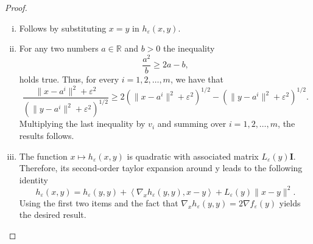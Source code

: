 \documentclass[11pt]{article}
\numberwithin{equation}{section}
\begin{document}
\begin{proof}
\begin{enumerate}[(i)]
	\item Follows by substituting $x=y$ in $h_{\varepsilon}(x,y)$.
	\item For any two numbers $a \in \mathbb{R}$ and $b>0$ the inequality 
	\begin{equation*}
		\frac{a^2}{b} \geq 2a - b ,
	\end{equation*}
	holds true. Thus, for every $i=1,2, \ldots ,m$, we have that
	\begin{equation*}
		\frac{\|x-a^i\|^2 + {\varepsilon}^2}{\left( \|y-a^i\|^2 + {\varepsilon}^2 \right)^{1/2}} \geq 2\left( \|x-a^i\|^2 + {\varepsilon}^2 \right)^{1/2} - \left( \|y-a^i\|^2 + {\varepsilon}^2 \right)^{1/2} .
	\end{equation*}
	Multiplying the last inequality by $v_i$ and summing over $i=1,2, \ldots, m$, the results follows. 
	\item The function $x \mapsto h_{\varepsilon}(x,y)$ is quadratic with associated matrix $L_{\varepsilon}(y)\textbf{I}$. Therefore, its second-order taylor expansion around y leads to the following identity
	\begin{equation*}
		h_{\varepsilon}(x,y) = h_{\varepsilon}(y,y) + \left\langle \nabla_x h_{\varepsilon}(y,y) , x-y \right\rangle + L_{\varepsilon}(y) \|x-y\|^2 .
	\end{equation*}
	Using the first two items and the fact that $\nabla_x h_{\varepsilon}(y,y) = 2\nabla f_{\varepsilon}(y)$ yields the desired result.
\end{enumerate}
\end{proof}
\end{document}
